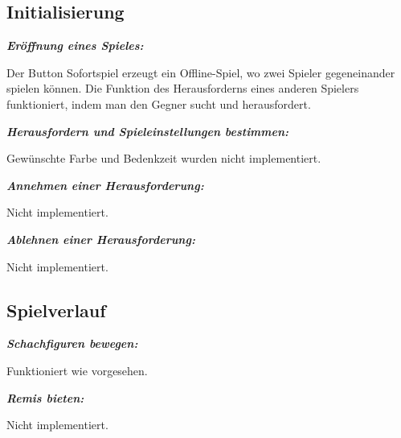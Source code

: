 \documentclass[parskip=full]{scrartcl}
\begin{document}
\begin{description}
	
	\subsection{Initialisierung}
	\item[T2010] \textbf{\textit{Eröffnung eines Spieles: }} 
	\begin{description}
	\item Der Button Sofortspiel erzeugt ein Offline-Spiel, wo zwei Spieler gegeneinander spielen können. Die Funktion des Herausforderns eines anderen Spielers funktioniert, indem man den Gegner sucht und herausfordert.
	\end{description}
	

	
	\item[T2020] \textbf{\textit{Herausfordern und Spieleinstellungen bestimmen: }} 
	\begin{description}
	\item Gewünschte Farbe und Bedenkzeit wurden nicht implementiert.
	\end{description}
	

	
	\item[T2030] \textbf{\textit{Annehmen einer Herausforderung: }} 
	\begin{description}
	\item Nicht implementiert.
	\end{description}

	
	\item[T2040] \textbf{\textit{Ablehnen einer Herausforderung: }} 
	\begin{description}
	\item Nicht implementiert.
	\end{description}

	
	\subsection{Spielverlauf}
	
	\item[T3010] \textbf{\textit{Schachfiguren bewegen: }} 
	\begin{description}
	\item Funktioniert wie vorgesehen.
	\end{description}
		
	
	\item[T3020] \textbf{\textit{Remis bieten: }} 
	\begin{description}
	\item Nicht implementiert.
	\end{description}


\end{description}
\end{document}
